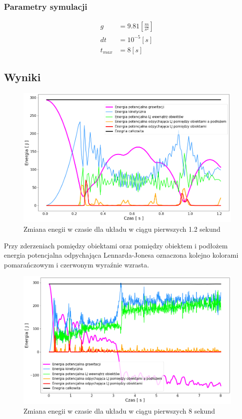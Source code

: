 \documentclass[12pt, letterpaper]{report}
\begin{document}
    \subsubsection{Parametry symulacji}
    \begin{align*}
        g &= 9.81 [\frac{m}{s^2}] \\
        dt &= 10^{-5} [s] \\
        t_{max} &= 8 [s]
    \end{align*}
    \pagebreak
    \subsection{Wyniki}
    \begin{figure}[h]
        \centering
        \includegraphics[width=13cm]{energy_test_0to2s}
        \caption{Zmiana enegii w czasie dla układu w ciągu pierwszych 1.2 sekund}
    \end{figure}

    Przy zderzeniach pomiędzy obiektami oraz pomiędzy obiektem i podłożem energia potencjalna
    odpychająca Lennarda-Jonesa oznaczona kolejno kolorami pomarańczowym i czerwonym
    wyraźnie wzrasta.
    \begin{figure}[h]
        \centering
        \includegraphics[width=13cm]{energy_test_0to8s}
        \caption{Zmiana enegii w czasie dla układu w ciągu pierwszych 8 sekund}
    \end{figure}
    
\end{document}
